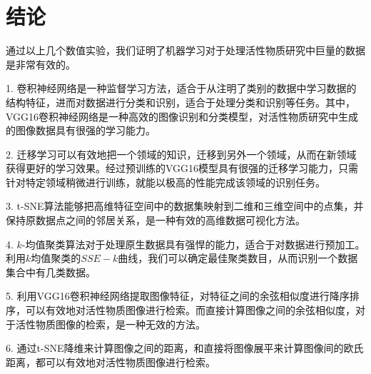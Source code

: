 \section{结论}
通过以上几个数值实验，我们证明了机器学习对于处理活性物质研究中巨量的数据是非常有效的。

1. 卷积神经网络是一种监督学习方法，适合于从注明了类别的数据中学习数据的结构特征，进而对数据进行分类和识别，适合于处理分类和识别等任务。其中，VGG16卷积神经网络是一种高效的图像识别和分类模型，对活性物质研究中生成的图像数据具有很强的学习能力。

2. 迁移学习可以有效地把一个领域的知识，迁移到另外一个领域，从而在新领域获得更好的学习效果。经过预训练的VGG16模型具有很强的迁移学习能力，只需针对特定领域稍微进行训练，就能以极高的性能完成该领域的识别任务。

3. t-SNE算法能够把高维特征空间中的数据集映射到二维和三维空间中的点集，并保持原数据点之间的邻居关系，是一种有效的高维数据可视化方法。

4. $k$-均值聚类算法对于处理原生数据具有强悍的能力，适合于对数据进行预加工。利用$k$均值聚类的$SSE-k$曲线，我们可以确定最佳聚类数目，从而识别一个数据集合中有几类数据。

5. 利用VGG16卷积神经网络提取图像特征，对特征之间的余弦相似度进行降序排序，可以有效地对活性物质图像进行检索。而直接计算图像之间的余弦相似度，对于活性物质图像的检索，是一种无效的方法。

6. 通过t-SNE降维来计算图像之间的距离，和直接将图像展平来计算图像间的欧氏距离，都可以有效地对活性物质图像进行检索。